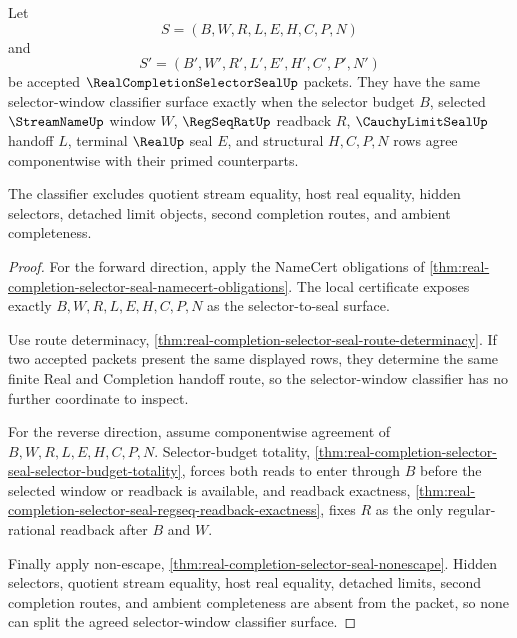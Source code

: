 \begin{theorem}
\label{thm:real-completion-selector-seal-selector-window-classifier-pullback}
Let
$$
S=(B,W,R,L,E,H,C,P,N)
$$
and
$$
S'=(B',W',R',L',E',H',C',P',N')
$$
be accepted $\RealCompletionSelectorSealUp$ packets. They have the same selector-window classifier surface exactly when the selector budget $B$, selected $\StreamNameUp$ window $W$, $\RegSeqRatUp$ readback $R$, $\CauchyLimitSealUp$ handoff $L$, terminal $\RealUp$ seal $E$, and structural $H,C,P,N$ rows agree componentwise with their primed counterparts.

The classifier excludes quotient stream equality, host real equality, hidden selectors, detached limit objects, second completion routes, and ambient completeness.
\end{theorem}
\begin{proof}
For the forward direction, apply the NameCert obligations of \autoref{thm:real-completion-selector-seal-namecert-obligations}. The local certificate exposes exactly $B,W,R,L,E,H,C,P,N$ as the selector-to-seal surface.

Use route determinacy, \autoref{thm:real-completion-selector-seal-route-determinacy}. If two accepted packets present the same displayed rows, they determine the same finite Real and Completion handoff route, so the selector-window classifier has no further coordinate to inspect.

For the reverse direction, assume componentwise agreement of $B,W,R,L,E,H,C,P,N$. Selector-budget totality, \autoref{thm:real-completion-selector-seal-selector-budget-totality}, forces both reads to enter through $B$ before the selected window or readback is available, and readback exactness, \autoref{thm:real-completion-selector-seal-regseq-readback-exactness}, fixes $R$ as the only regular-rational readback after $B$ and $W$.

Finally apply non-escape, \autoref{thm:real-completion-selector-seal-nonescape}. Hidden selectors, quotient stream equality, host real equality, detached limits, second completion routes, and ambient completeness are absent from the packet, so none can split the agreed selector-window classifier surface.
\end{proof}


